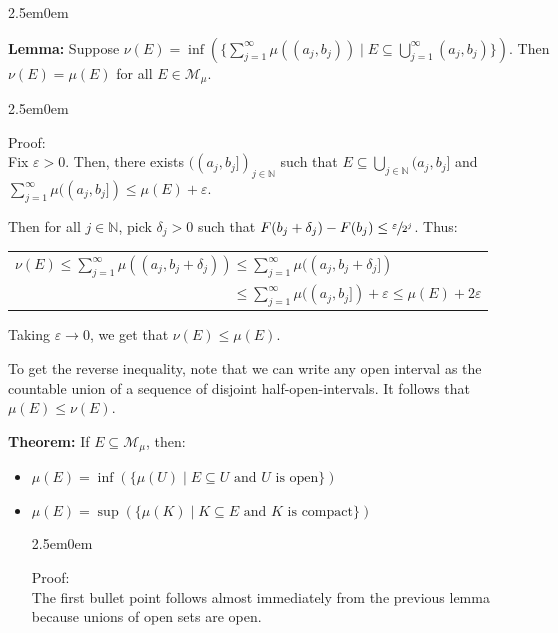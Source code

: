 \documentclass{book}
\newcommand{\hTwo}{%
\color{MidnightBlue}%
   \fontsize{13}{15}\selectfont%
}
\newcommand{\hThree}{%
   \color{PineGreen!85!Orange}
   \fontsize{12}{14}\selectfont%
}
\newenvironment{myIndent}{%
   \begin{adjustwidth}{2.5em}{0em}%
}{%
   \end{adjustwidth}%
}
\newcommand{\blab}[1]{\textbf{#1}}
\newcommand{\retTwo}{\hfill\bigbreak}
\begin{document}
\begin{myIndent}\hTwo
   \blab{Lemma:} Suppose $\nu(E) = \inf(\{\sum\limits_{j=1}^\infty \mu((a_j, b_j)) \mid E \subseteq \bigcup\limits_{j=1}^\infty (a_j, b_j)\})$. Then\\ [-8pt] $\nu(E) = \mu(E)$ for all $E \in \mathcal{M}_{\mu}$.\retTwo
   
   \begin{myIndent}\hThree
      Proof:\\
      Fix $\varepsilon > 0$. Then, there exists $((a_j, b_j])_{j \in \mathbb{N}}$ such that $E \subseteq \bigcup\limits_{j \in \mathbb{N}}(a_j, b_j]$ and\\ [-9pt] $\sum\limits_{j=1}^\infty \mu((a_j, b_j]) \leq \mu(E) + \varepsilon$.\retTwo

      Then for all $j \in \mathbb{N}$, pick $\delta_j > 0$ such that $F(b_j + \delta_j) - F(b_j) \leq \sfrac{\varepsilon}{2^j}$. Thus:

      {\centering
      \begin{tabular}{l}
          $\nu(E) \leq \sum\limits_{j=1}^\infty \mu((a_j, b_j + \delta_j)) \leq \sum\limits_{j=1}^\infty \mu((a_j, b_j + \delta_j])$\\ [10pt] $\phantom{\nu(E) \leq \sum\limits_{j=1}^\infty \mu((a_j, b_j + \delta_j))} \leq \sum\limits_{j=1}^\infty \mu((a_j, b_j]) + \varepsilon \leq \mu(E) + 2\varepsilon$ 
      \end{tabular}\retTwo\par}

      Taking $\varepsilon \rightarrow 0$, we get that $\nu(E) \leq \mu(E)$.\retTwo

      To get the reverse inequality, note that we can write any open interval as the\\ countable union of a sequence of disjoint half-open-intervals. It follows that\\ $\mu(E) \leq \nu(E)$.\retTwo
   \end{myIndent}

   \blab{Theorem:} If $E \subseteq \mathcal{M}_\mu$, then:
   \begin{itemize}
      \item $\mu(E) = \inf(\{\mu(U) \mid E \subseteq U \text{ and } U \text{ is open}\})$
      \item $\mu(E) = \sup(\{\mu(K) \mid K \subseteq E \text{ and } K \text{ is compact}\})$
      
      \begin{myIndent}\hThree
         Proof:\\
         The first bullet point follows almost immediately from the previous lemma\\ because unions of open sets are open.\retTwo


\end{myIndent}
\end{itemize}
\end{myIndent}
\end{document}
